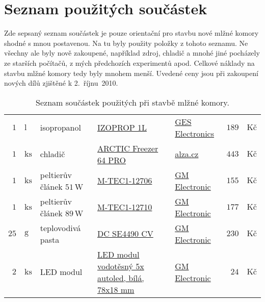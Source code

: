 \chapter{Seznam použitých součástek}

Zde sepsaný seznam součástek je pouze orientační pro stavbu nové mlžné komory shodné s mnou postavenou. Na tu byly použity položky z tohoto seznamu. Ne všechny ale byly nově zakoupené, například zdroj, chladič a mnohé jiné pocházely ze starších počítačů, z mých předchozích experimentů apod. Celkové náklady na stavbu mlžné komory tedy byly mnohem menší. Uvedené ceny jsou při zakoupení nových dílů zjištěné k 2.~říjnu~2010.

\begin{table}[h]
	\centering
	\caption{Seznam součástek použitých při stavbě mlžné komory.}
	\label{tab:SeznamSoucastek:Komora}
	\begin{tabular}[t]{|r@{$\,$}l|p{4.6cm}|p{4.2cm}|p{3.1cm}|r@{$\,$}l|}
		\hline
		$ 1 $ & $\mathrm{l} $ & isopropanol												&	\href{http://www.ges.cz/-izoprop-1l-ges08000029.html}{IZOPROP 1L}																		&	\href{http://www.ges.cz}{GES Electronics}								&	$ 189 $ & $\textrm{Kč} $	\\
		$ 1 $ & $\mathrm{ks} $ & chladič 													&	\href{http://www.alza.cz/chladic-arctic-freezer-64-d56766.htm}{ARCTIC Freezer 64 PRO}									&	\href{http://www.alza.cz}{alza.cz}												&	$ 443 $ & $\textrm{Kč} $	\\
		$ 1 $ & $\mathrm{ks} $ & peltierův článek $ 51 \, \mathrm{W} $	&	\href{http://www.gme.cz/cz/m-tec1-12706-p601-017.html}{M-TEC1-12706}														&	\href{http://www.gme.cz}{GM Electronic}									&	$ 155 $ & $\textrm{Kč} $	\\	
		$ 1 $ & $\mathrm{ks} $ & peltierův článek $ 89 \, \mathrm{W} $	&	\href{http://www.gme.cz/cz/m-tec1-12710-p601-012.html}{M-TEC1-12710}														&	\href{http://www.gme.cz}{GM Electronic}									&	$ 177 $ & $\textrm{Kč} $	\\	
		$ 25 $ & $\mathrm{g} $ & teplovodivá pasta									&	\href{http://www.gme.cz/cz/pasta-teplovodiva-dc-se4490-cv-p749-069.html}{DC SE4490 CV}							&	\href{http://www.gme.cz}{GM Electronic}									&	$ 230 $ & $\textrm{Kč} $	\\	
		$ 2 $ & $\mathrm{ks} $ &LED modul												&	\href{http://www.gme.cz/cz/led-modul-vodotesny-5x-autoled-bila-78x18-mm-p960-164.html}{LED modul vodotěsný 5x autoled, bílá, 78x18 mm}			&	\href{http://www.gme.cz}{GM Electronic}			&	$ 24 $ & $\textrm{Kč} $	\\	

\end{tabular}
\end{table}
